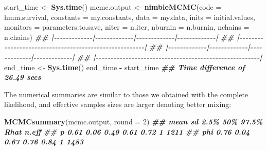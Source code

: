 \documentclass[
  12pt,
]{krantz}
\newenvironment{Shaded}{\begin{snugshade}}{\end{snugshade}}
\newcommand{\AttributeTok}[1]{\textcolor[rgb]{0.13,0.29,0.53}{#1}}
\newcommand{\DecValTok}[1]{\textcolor[rgb]{0.00,0.00,0.81}{#1}}
\newcommand{\DocumentationTok}[1]{\textcolor[rgb]{0.56,0.35,0.01}{\textbf{\textit{#1}}}}
\newcommand{\FunctionTok}[1]{\textcolor[rgb]{0.13,0.29,0.53}{\textbf{#1}}}
\newcommand{\NormalTok}[1]{#1}
\newcommand{\OtherTok}[1]{\textcolor[rgb]{0.56,0.35,0.01}{#1}}
\newcommand{\SpecialCharTok}[1]{\textcolor[rgb]{0.81,0.36,0.00}{\textbf{#1}}}
\begin{document}
\begin{Shaded}
\begin{Highlighting}[]
\NormalTok{start\_time }\OtherTok{\textless{}{-}} \FunctionTok{Sys.time}\NormalTok{()}
\NormalTok{mcmc.output }\OtherTok{\textless{}{-}} \FunctionTok{nimbleMCMC}\NormalTok{(}\AttributeTok{code =}\NormalTok{ hmm.survival,}
                          \AttributeTok{constants =}\NormalTok{ my.constants,}
                          \AttributeTok{data =}\NormalTok{ my.data,}
                          \AttributeTok{inits =}\NormalTok{ initial.values,}
                          \AttributeTok{monitors =}\NormalTok{ parameters.to.save,}
                          \AttributeTok{niter =}\NormalTok{ n.iter,}
                          \AttributeTok{nburnin =}\NormalTok{ n.burnin,}
                          \AttributeTok{nchains =}\NormalTok{ n.chains)}
\DocumentationTok{\#\# |{-}{-}{-}{-}{-}{-}{-}{-}{-}{-}{-}{-}{-}|{-}{-}{-}{-}{-}{-}{-}{-}{-}{-}{-}{-}{-}|{-}{-}{-}{-}{-}{-}{-}{-}{-}{-}{-}{-}{-}|{-}{-}{-}{-}{-}{-}{-}{-}{-}{-}{-}{-}{-}|}
\DocumentationTok{\#\# |{-}{-}{-}{-}{-}{-}{-}{-}{-}{-}{-}{-}{-}{-}{-}{-}{-}{-}{-}{-}{-}{-}{-}{-}{-}{-}{-}{-}{-}{-}{-}{-}{-}{-}{-}{-}{-}{-}{-}{-}{-}{-}{-}{-}{-}{-}{-}{-}{-}{-}{-}{-}{-}{-}{-}|}
\DocumentationTok{\#\# |{-}{-}{-}{-}{-}{-}{-}{-}{-}{-}{-}{-}{-}|{-}{-}{-}{-}{-}{-}{-}{-}{-}{-}{-}{-}{-}|{-}{-}{-}{-}{-}{-}{-}{-}{-}{-}{-}{-}{-}|{-}{-}{-}{-}{-}{-}{-}{-}{-}{-}{-}{-}{-}|}
\DocumentationTok{\#\# |{-}{-}{-}{-}{-}{-}{-}{-}{-}{-}{-}{-}{-}{-}{-}{-}{-}{-}{-}{-}{-}{-}{-}{-}{-}{-}{-}{-}{-}{-}{-}{-}{-}{-}{-}{-}{-}{-}{-}{-}{-}{-}{-}{-}{-}{-}{-}{-}{-}{-}{-}{-}{-}{-}{-}|}
\NormalTok{end\_time }\OtherTok{\textless{}{-}} \FunctionTok{Sys.time}\NormalTok{()}
\NormalTok{end\_time }\SpecialCharTok{{-}}\NormalTok{ start\_time}
\DocumentationTok{\#\# Time difference of 26.49 secs}
\end{Highlighting}
\end{Shaded}

The numerical summaries are similar to those we obtained with the complete likelihood, and effective samples sizes are larger denoting better mixing:

\begin{Shaded}
\begin{Highlighting}[]
\FunctionTok{MCMCsummary}\NormalTok{(mcmc.output, }\AttributeTok{round =} \DecValTok{2}\NormalTok{)}
\DocumentationTok{\#\#     mean   sd 2.5\%  50\% 97.5\% Rhat n.eff}
\DocumentationTok{\#\# p   0.61 0.06 0.49 0.61  0.72    1  1211}
\DocumentationTok{\#\# phi 0.76 0.04 0.67 0.76  0.84    1  1483}
\end{Highlighting}
\end{Shaded}
\end{document}
